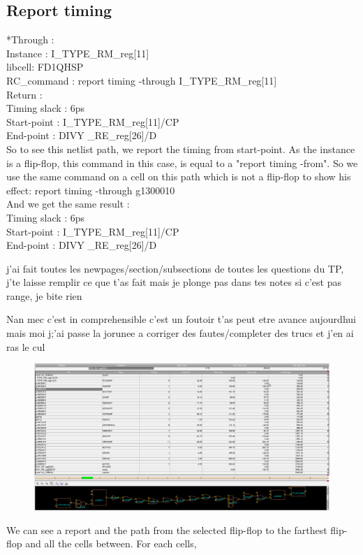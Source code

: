 \subsection*{Report timing}

*{Through :\\}
Instance : I\_TYPE\_RM\_reg[11]\\
libcell: FD1QHSP\\
RC\_command : report timing -through I\_TYPE\_RM\_reg[11]\\

Return :\\
Timing slack :       6ps\\
Start-point  : I\_TYPE\_RM\_reg[11]/CP\\
End-point    : DIVY  \_RE\_reg[26]/D\\

So to see this netlist path, we report the timing from start-point.
As the instance is a flip-flop, this command in this case, is equal to a "report timing -from".
So we use the same command on a cell on this path which is not a flip-flop to show his effect: 
report timing -through g1300010\\
And we get the same result :\\
Timing slack :       6ps \\
Start-point  : I\_TYPE\_RM\_reg[11]/CP\\
End-point    : DIVY  \_RE\_reg[26]/D\\

\newpage


j'ai fait toutes les newpages/section/subsections de toutes les questions du TP, j'te laisse remplir ce que t'as fait mais je plonge pas dans tes notes si c'est pas range, je bite rien

Nan mec c'est in comprehensible c'est un foutoir t'as peut etre avance aujourdhui mais moi j;'ai passe la jorunee a corriger des fautes/completer des trucs et j'en ai ras le cul
\begin{figure}[h!]
    \includegraphics[width=1.1\linewidth, frame]{src_tex/images/through_report.png}
    \label{fig:through_report_draw}
\end{figure}

We can see a report and the path from the selected flip-flop to the farthest flip-flop and all the cells between. For each cells, 